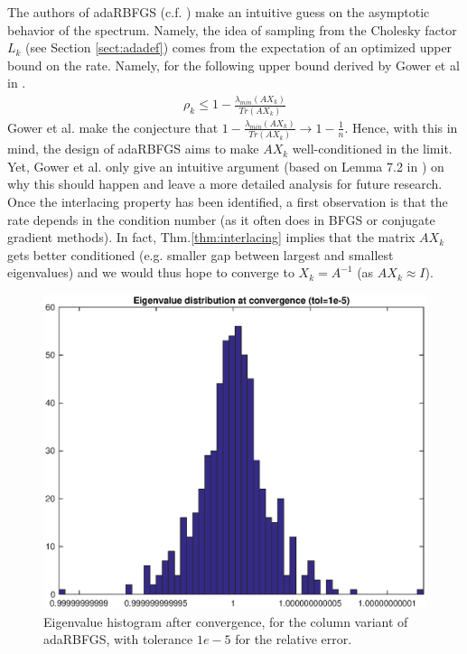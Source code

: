 \documentclass[12pt,conference,compsocconf]{IEEEtran}
\begin{document}
The authors of adaRBFGS (c.f. \cite{Gower1}) make an intuitive guess on the asymptotic behavior of the spectrum. Namely, the idea of sampling from the Cholesky factor $L_k$ (see Section \ref{sect:adadef}) comes from the expectation of an optimized upper bound on the rate. Namely, for the following upper bound derived by Gower et al in \cite{Gower2}. 
\begin{align} \label{eq:upperbtrada}
	\rho_k \leq 1- \frac{\lambda_{min}(AX_k)}{Tr(AX_k)}
\end{align}
Gower et al. make the conjecture that $ 1- \frac{\lambda_{min}(AX_k)}{Tr(AX_k)}\rightarrow 1 - \frac{1}{n}.$ Hence, with this in mind, the design of adaRBFGS aims to make $AX_k$ well-conditioned in the limit. Yet, Gower et al. only give an intuitive argument (based on Lemma 7.2 in \cite{Gower1} ) on why this should happen and leave  a more detailed analysis for future research.\\
Once the interlacing property has been identified, a first observation is that the rate depends in the condition number (as it often does in BFGS or conjugate gradient methods). In fact, Thm.\ref{thm:interlacing} implies that the matrix $AX_k$ gets better conditioned (e.g. smaller gap between largest and smallest eigenvalues) and we would thus hope to converge to $X_k=A^{-1}$ (as $AX_k\approx I$).
\begin{figure}
  \centering
  \includegraphics[height=0.7\columnwidth,width=1.0\columnwidth]{eigditstol5.eps}
  \caption{Eigenvalue histogram after convergence, for the column variant of adaRBFGS, with tolerance $1e-5$ for the relative error. \label{fig:eighist5}}  
\end{figure}
\end{document}
